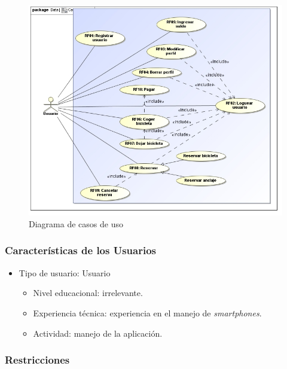 \begin{figure}[!htb]
	\centering
	\includegraphics[width=\linewidth,height=\textheight,keepaspectratio]{Images/Diagramas/01_CasosDeUso}
	\caption{Diagrama de casos de uso}
	\label{fig:diagramaCasosUso}
\end{figure}


\FloatBarrier %
\subsubsection{Características de los Usuarios}

\begin{itemize}
	\item Tipo de usuario: Usuario
	\begin{itemize}
		\item Nivel educacional: irrelevante.
		\item Experiencia técnica: experiencia en el manejo de \textit{smartphones}.
		\item Actividad: manejo de la aplicación.
	\end{itemize}
\end{itemize}

\subsubsection{Restricciones}

